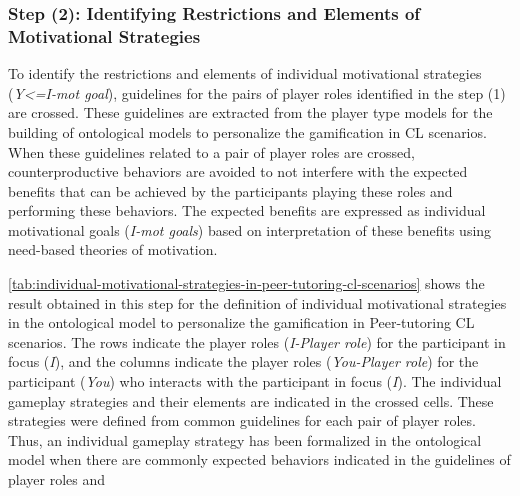 \subsubsection*{Step (2): Identifying Restrictions and Elements of Motivational Strategies}

To identify the restrictions and elements of individual motivational strategies (\emph{Y<=I-mot goal}), guidelines for the pairs of player roles identified in the step (1) are crossed.
These guidelines are extracted from the player type models for the building of ontological models to personalize the gamification in CL scenarios.
When these guidelines related to a pair of player roles are crossed, counterproductive behaviors are avoided to not interfere with the expected benefits that can be achieved by the participants playing these roles and performing these behaviors.
The expected benefits are expressed as individual motivational goals (\emph{I-mot goals}) based on interpretation of these benefits using need-based theories of motivation. 

\autoref{tab:individual-motivational-strategies-in-peer-tutoring-cl-scenarios} shows the result obtained in this step for the definition of individual motivational strategies in the ontological model to personalize the gamification in Peer-tutoring CL scenarios.
The rows indicate the player roles (\emph{I-Player role}) for the participant in focus (\emph{I}), and the columns indicate the player roles (\emph{You-Player role}) for the participant (\emph{You}) who interacts with the participant in focus (\emph{I}).
The individual gameplay strategies and their elements are indicated in the crossed cells.
These strategies were defined from common guidelines for each pair of player roles.
Thus, an individual gameplay strategy has been formalized in the ontological model when there are commonly expected behaviors indicated in the guidelines of player roles  and 
 

